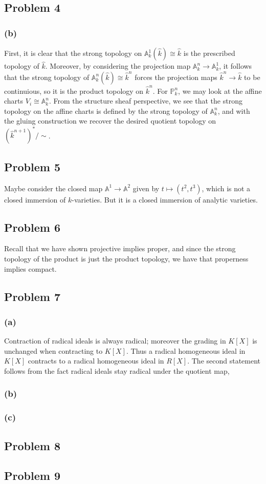 \documentclass{article}
\theoremstyle{definition}
\theoremstyle{definition}
\theoremstyle{definition}
\theoremstyle{definition}
\theoremstyle{definition}
\theoremstyle{definition}
\theoremstyle{definition}
\begin{document}
\subsection*{Problem 4}
\subsubsection*{(b)}
First, it is clear that the strong topology on $\mathbb{A}^1_k(\widehat{k})\cong \widehat{k}$ is the prescribed topology of $\widehat{k}$. Moreover, by considering the projection map $\mathbb{A}^n_k\to \mathbb{A}^1_k$, it follows that the strong topology of $\mathbb{A}^n_k(\widehat{k})\cong \widehat{k}^n$ forces the projection maps $\widehat{k}^n\to \widehat{k}$ to be continuious, so it is the product topology on $\widehat{k}^n$. For $\mathbb{P}^n_k$, we may look at the affine charts $V_i\cong \mathbb{A}^n_k$. From the structure sheaf perspective, we see that the strong topology on the affine charts is defined by the 
strong topology of $\mathbb{A}^n_k$, and with the gluing construction we recover the desired quotient topology on $(\widehat{k}^{n+1})^*/\sim$.


\subsection*{Problem 5}
Maybe consider the closed map $\mathbb{A}^1\to \mathbb{A}^2$ given by $t\mapsto (t^2,t^3)$, which is not a closed immersion of $k$-varieties. But it is a closed immersion of analytic varieties. 


\subsection*{Problem 6}
Recall that we have shown projective implies proper, and since the strong topology of the product is just the product topology, we have that properness implies compact. 


\subsection*{Problem 7}
\subsubsection*{(a)}
Contraction of radical ideals is always radical; moreover the grading in $K[X]$ is unchanged when contracting to $K[X]$. Thus a radical homogeneous ideal in $K[X]$ contracts to a radical homogeneous ideal in $R[X]$. The second statement follows from the fact radical ideals stay radical under the quotient map, 
\subsubsection*{(b)}
\subsubsection*{(c)}

\subsection*{Problem 8}
\subsection*{Problem 9}
\end{document}

